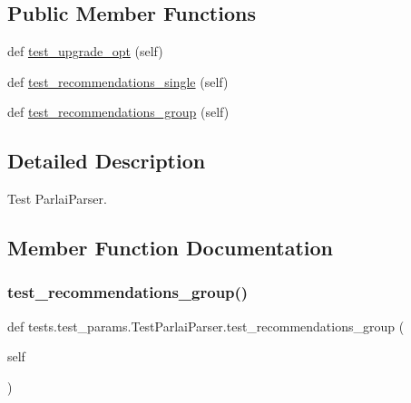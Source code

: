 \subsection*{Public Member Functions}
\begin{DoxyCompactItemize}
\item 
def \hyperlink{classtests_1_1test__params_1_1TestParlaiParser_acf8ab1cdd831a5743f56623c0af87d5e}{test\+\_\+upgrade\+\_\+opt} (self)
\item 
def \hyperlink{classtests_1_1test__params_1_1TestParlaiParser_aa34d539da2370132f7a4974008422f55}{test\+\_\+recommendations\+\_\+single} (self)
\item 
def \hyperlink{classtests_1_1test__params_1_1TestParlaiParser_af137ef0fe576f22f6bee508bd52b2b86}{test\+\_\+recommendations\+\_\+group} (self)
\end{DoxyCompactItemize}


\subsection{Detailed Description}
\begin{DoxyVerb}Test ParlaiParser.
\end{DoxyVerb}
 

\subsection{Member Function Documentation}
\mbox{\label{classtests_1_1test__params_1_1TestParlaiParser_af137ef0fe576f22f6bee508bd52b2b86}} 
\subsubsection{\texorpdfstring{test\+\_\+recommendations\+\_\+group()}{test\_recommendations\_group()}}
{\footnotesize\ttfamily def tests.\+test\+\_\+params.\+Test\+Parlai\+Parser.\+test\+\_\+recommendations\+\_\+group (\begin{DoxyParamCaption}\item[{}]{self }\end{DoxyParamCaption})}

